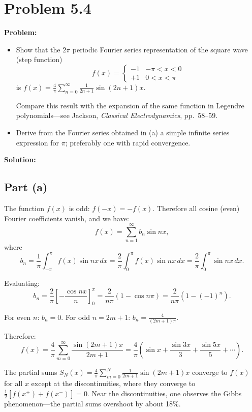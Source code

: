 \documentclass[12pt]{article}
\begin{document}
\section*{Problem 5.4}

\textbf{Problem:}
\begin{itemize}
\item[(a)] Show that the $2\pi$ periodic Fourier series representation of the square wave (step function)
\[
f(x) = \begin{cases} -1 & -\pi < x < 0 \\ +1 & 0 < x < \pi \end{cases}
\]
is $f(x) = \frac{4}{\pi}\sum_{n=0}^{\infty} \frac{1}{2n+1}\sin(2n+1)x$.

Compare this result with the expansion of the same function in Legendre polynomials---see Jackson, \emph{Classical Electrodynamics}, pp.\ 58--59.

\item[(b)] Derive from the Fourier series obtained in (a) a simple infinite series expression for $\pi$; preferably one with rapid convergence.
\end{itemize}

\bigskip
\textbf{Solution:}

\subsection*{Part (a)}

The function $f(x)$ is odd: $f(-x) = -f(x)$. Therefore all cosine (even) Fourier coefficients vanish, and we have:
\[
f(x) = \sum_{n=1}^{\infty} b_n \sin nx,
\]
where
\[
b_n = \frac{1}{\pi}\int_{-\pi}^{\pi} f(x)\sin nx\,dx = \frac{2}{\pi}\int_0^{\pi} f(x)\sin nx\,dx = \frac{2}{\pi}\int_0^{\pi}\sin nx\,dx.
\]

Evaluating:
\[
b_n = \frac{2}{\pi}\left[-\frac{\cos nx}{n}\right]_0^{\pi} = \frac{2}{n\pi}\left(1 - \cos n\pi\right) = \frac{2}{n\pi}\left(1 - (-1)^n\right).
\]

For even $n$: $b_n = 0$. For odd $n = 2m+1$: $b_n = \frac{4}{(2m+1)\pi}$.

Therefore:
\[
\boxed{f(x) = \frac{4}{\pi}\sum_{m=0}^{\infty} \frac{\sin(2m+1)x}{2m+1} = \frac{4}{\pi}\left(\sin x + \frac{\sin 3x}{3} + \frac{\sin 5x}{5} + \cdots\right).}
\]

The partial sums $S_N(x) = \frac{4}{\pi}\sum_{m=0}^{N}\frac{1}{2m+1}\sin(2m+1)x$ converge to $f(x)$ for all $x$ except at the discontinuities, where they converge to $\frac{1}{2}[f(x^+)+f(x^-)] = 0$. Near the discontinuities, one observes the Gibbs phenomenon---the partial sums overshoot by about 18\%.
\end{document}
